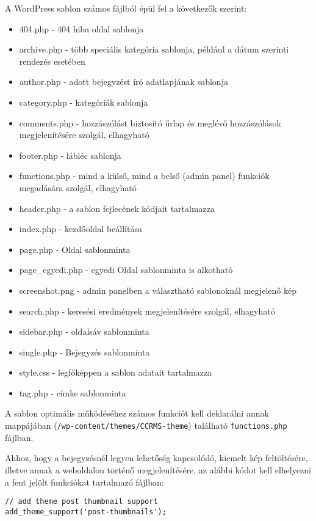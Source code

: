 
A WordPress sablon számos fájlból épül fel a következők szerint:

\begin{itemize}
	\item 404.php - 404 hiba oldal sablonja
	\item archive.php - több speciális kategória sablonja, például a dátum szerinti rendezés esetében
	\item author.php - adott bejegyzést író adatlapjának sablonja
	\item category.php - kategóriák sablonja
	\item comments.php - hozzászólást biztosító űrlap és meglévő hozzászólások megjelenítésére szolgál, elhagyható
	\item footer.php - lábléc sablonja
	\item functions.php - mind a külső, mind a belső (admin panel) funkciók megadására szolgál, elhagyható
	\item header.php - a sablon fejlecének kódjait tartalmazza
	\item index.php - kezdőoldal beállítása
	\item page.php - Oldal sablonminta
	\item page\_egyedi.php - egyedi Oldal sablonminta is alkotható
	\item screenshot.png - admin panelben a választható sablonoknál megjelenő kép
	\item search.php - keresési eredmények megjelenítésére szolgál, elhagyható
	\item sidebar.php - oldalsáv sablonminta
	\item single.php - Bejegyzés sablonminta
	\item style.css - legfőképpen a sablon adatait tartalmazza
	\item tag.php - címke sablonminta
\end{itemize}

A sablon optimális működéséhez számos funkciót kell deklarálni annak mappájában (\texttt{/wp-content/themes/CCRMS-theme}) található \texttt{functions.php} fájlban.

Ahhoz, hogy a bejegyzésnél legyen lehetőség kapcsolódó, kiemelt kép feltöltésére, illetve annak a weboldalon történő megjelenítésére, az alábbi kódot kell elhelyezni a fent jelölt funkciókat tartalmazó fájlban:

\begin{lstlisting}
// add theme post thumbnail support
add_theme_support('post-thumbnails');
\end{lstlisting}

